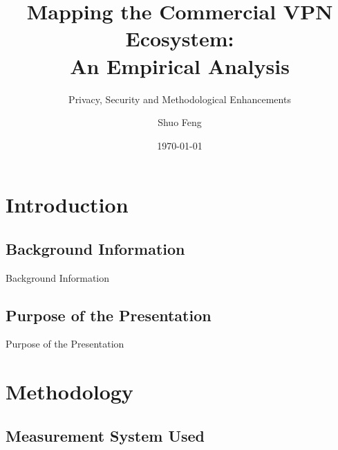 \documentclass{beamer}
\title[Mapping the Commercial VPN Ecosystem]{
    Mapping the Commercial VPN Ecosystem:\\
    An Empirical Analysis
}
\subtitle[]{Privacy, Security and Methodological Enhancements}
\author[S. Feng]{Shuo Feng}
\institute[NIMS Lab]{NIMS Lab}
\date{\today}
\begin{document}
\frame{\titlepage}



\section{Introduction}

\subsection{Background Information}

\begin{frame}{Background Information}
\end{frame}

\subsection{Purpose of the Presentation}

\begin{frame}{Purpose of the Presentation}
\end{frame}

\section{Methodology}

\subsection{Measurement System Used}
\end{document}

